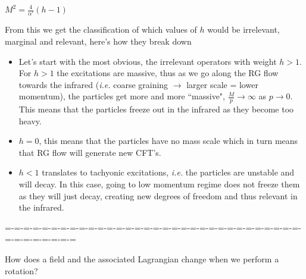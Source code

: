 \documentclass[aps,preprint,preprintnumbers,nofootinbib,showpacs,prd]{revtex4-1}
\newcommand{\ie}{{\it i.e.} }
\newcommand{\bit}{\begin{itemize}}
\newcommand{\eit}{\end{itemize}}
\begin{document}
$M^2 = \frac{4}{\alpha'} (h - 1)$

From this we get the classification of which values of $h$ would be irrelevant, marginal and relevant, here's how they break down
\bit
\item Let's start with the most obvious, the irrelevant operators with weight $h > 1$. For $h > 1$ the excitations are massive, thus as we go along the RG flow towards the infrared (\ie coarse graining $\rightarrow$ larger scale = lower momentum), the particles get more and more ``massive", $\frac{M}{p} \rightarrow \infty$ as $p \rightarrow 0$. This means that the particles freeze out in the infrared as they become too heavy.
\item $h = 0$, this means that the particles have no mass scale which in turn means that RG flow will generate new CFT's.
\item $h < 1$ translates to tachyonic excitations, \ie the particles are unstable and will decay. In this case, going to low momentum regime does not freeze them as they will just decay, creating new degrees of freedom and thus relevant in the infrared.
\eit




=-=-=-=-=-=-=-=-=-=-=-=-=-=-=-=-=-=-=-=-=-=-=-=-=-=-=-=-=-=-=-=-=-=-=-=-=-=-=-=



How does a field and the associated Lagrangian change when we perform a rotation?
\end{document}
